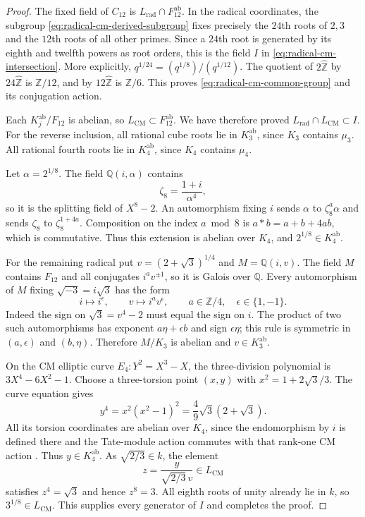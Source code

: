 \begin{proof}
The fixed field of $C_{12}$ is $L_{\mathrm{rad}}\cap F_{12}^{\mathrm{ab}}$.
In the radical coordinates, the subgroup
\eqref{eq:radical-cm-derived-subgroup} fixes precisely the
$24$th roots of $2,3$ and the $12$th roots of all other primes.
Since a $24$th root is generated by its eighth and twelfth powers
as root orders, this is the field $I$ in
\eqref{eq:radical-cm-intersection}.  More explicitly,
$q^{1/24}=(q^{1/8})/(q^{1/12})$.
The quotient of $2\widehat{\mathbb Z}$ by
$24\widehat{\mathbb Z}$ is $\mathbb Z/12$, and by
$12\widehat{\mathbb Z}$ is $\mathbb Z/6$.  This proves
\eqref{eq:radical-cm-common-group} and its conjugation action.

Each $K_j^{\mathrm{ab}}/F_{12}$ is abelian, so
$L_{\mathrm{CM}}\subset F_{12}^{\mathrm{ab}}$.  We have therefore
proved $L_{\mathrm{rad}}\cap L_{\mathrm{CM}}\subset I$.
For the reverse inclusion, all rational cube roots lie in
$K_3^{\mathrm{ab}}$, since $K_3$ contains $\mu_3$.
All rational fourth roots lie in $K_4^{\mathrm{ab}}$, since
$K_4$ contains $\mu_4$.

Let $\alpha=2^{1/8}$.  The field $\mathbb Q(i,\alpha)$ contains
\[
 \zeta_8=\frac{1+i}{\alpha^4},
\]
so it is the splitting field of $X^8-2$.  An automorphism fixing
$i$ sends $\alpha$ to $\zeta_8^a\alpha$ and sends $\zeta_8$ to
$\zeta_8^{1+4a}$.  Composition on the index $a\bmod8$ is
$a*b=a+b+4ab$, which is commutative.  Thus this extension is
abelian over $K_4$, and $2^{1/8}\in K_4^{\mathrm{ab}}$.

For the remaining radical put
$v=(2+\sqrt3)^{1/4}$ and $M=\mathbb Q(i,v)$.
The field $M$ contains $F_{12}$ and all conjugates
$i^a v^{\pm1}$, so it is Galois over $\mathbb Q$.
Every automorphism of $M$ fixing $\sqrt{-3}=i\sqrt3$ has the form
\[
 i\longmapsto i^\epsilon,\qquad
 v\longmapsto i^a v^\epsilon,
 \qquad a\in\mathbb Z/4,\quad\epsilon\in\{1,-1\}.
\]
Indeed the sign on $\sqrt3=v^4-2$ must equal the sign on $i$.
The product of two such automorphisms has exponent
$a\eta+\epsilon b$ and sign $\epsilon\eta$; this rule is
symmetric in $(a,\epsilon)$ and $(b,\eta)$.
Therefore $M/K_3$ is abelian and $v\in K_3^{\mathrm{ab}}$.

On the CM elliptic curve $E_4:Y^2=X^3-X$, the three-division
polynomial is $3X^4-6X^2-1$.  Choose a three-torsion point $(x,y)$
with $x^2=1+2\sqrt3/3$.  The curve equation gives
\[
 y^4=x^2(x^2-1)^2
       =\frac49\sqrt3(2+\sqrt3).
\]
All its torsion coordinates are abelian over $K_4$, since the
endomorphism by $i$ is defined there and the Tate-module action
commutes with that rank-one CM action
\cite[Proposition~12.13, printed p.~119]{MilneMF110}.
Thus $y\in K_4^{\mathrm{ab}}$.
As $\sqrt{2/3}\in k$, the element
\[
 z=\frac{y}{\sqrt{2/3}\,v}\in L_{\mathrm{CM}}
\]
satisfies $z^4=\sqrt3$ and hence $z^8=3$.
All eighth roots of unity already lie in $k$, so
$3^{1/8}\in L_{\mathrm{CM}}$.
This supplies every generator of $I$ and completes the proof.
\end{proof}

